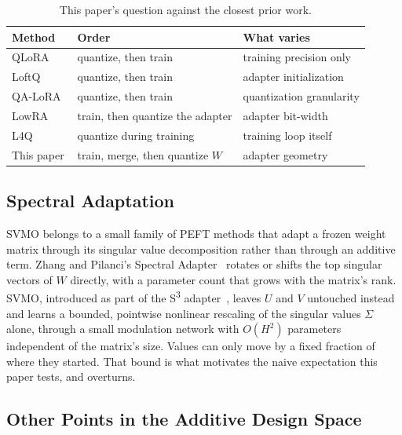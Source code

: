 \documentclass[conference]{IEEEtran}
\begin{document}
\begin{table}[t]
\centering
\caption{This paper's question against the closest prior work.}
\label{tab:related}
\begin{tabular}{@{}p{1.7cm}p{2.4cm}p{3.4cm}@{}}
\toprule
Method & Order & What varies \\
\midrule
QLoRA~\cite{dettmers2023qlora} & quantize, then train & training precision only \\
LoftQ~\cite{loftq} & quantize, then train & adapter initialization \\
QA-LoRA~\cite{qalora} & quantize, then train & quantization granularity \\
LowRA~\cite{lowra} & train, then quantize the adapter & adapter bit-width \\
L4Q~\cite{l4q} & quantize during training & training loop itself \\
This paper & train, merge, then quantize $W$ & adapter geometry \\
\bottomrule
\end{tabular}
\end{table}

\subsection{Spectral Adaptation}

SVMO belongs to a small family of PEFT methods that adapt a frozen weight matrix through its singular value decomposition rather than through an additive term. Zhang and Pilanci's Spectral Adapter~\cite{zhang2024spectral} rotates or shifts the top singular vectors of $W$ directly, with a parameter count that grows with the matrix's rank. SVMO, introduced as part of the S\textsuperscript{3} adapter~\cite{s3paper}, leaves $U$ and $V$ untouched instead and learns a bounded, pointwise nonlinear rescaling of the singular values $\Sigma$ alone, through a small modulation network with $O(H^2)$ parameters independent of the matrix's size. Values can only move by a fixed fraction of where they started. That bound is what motivates the naive expectation this paper tests, and overturns.

\subsection{Other Points in the Additive Design Space}
\end{document}

